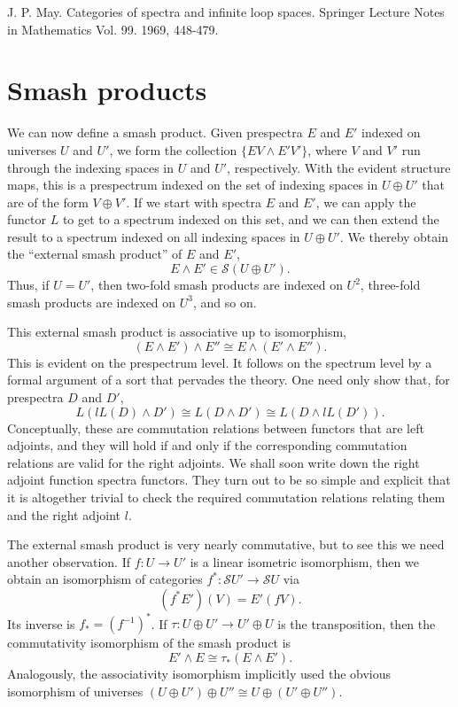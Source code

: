\begin{remark}
J. P. May. Categories of spectra and infinite loop spaces. Springer Lecture Notes in Mathematics Vol. 99. 1969, 448-479.
\end{remark}

\section{Smash products}

We can now define a smash product. Given prespectra $E$ and $E'$ indexed on universes $U$ and $U'$, we form the collection $\{EV \wedge E'V'\}$, where $V$ and $V'$ run through the indexing spaces in $U$ and $U'$, respectively. With the evident structure maps, this is a prespectrum indexed on the set of indexing spaces in $U \oplus U'$ that are of the form $V \oplus V'$. If we start with spectra $E$ and $E'$, we can apply the functor $L$ to get to a spectrum indexed on this set, and we can then extend the result to a spectrum indexed on all indexing spaces in $U \oplus U'$. We thereby obtain the ``external smash product'' of $E$ and $E'$,
\[ E \wedge E' \in \mathscr{S}(U \oplus U'). \]
Thus, if $U=U'$, then two-fold smash products are indexed on $U^2$, three-fold smash products are indexed on $U^3$, and so on.

This external smash product is associative up to isomorphism,
\[ (E \wedge E') \wedge E'' \cong E \wedge (E' \wedge E''). \]
This is evident on the prespectrum level. It follows on the spectrum level by a formal argument of a sort that pervades the theory. One need only show that, for prespectra $D$ and $D'$,
\[ L(lL(D) \wedge D') \cong L(D \wedge D') \cong L(D \wedge lL(D')). \]
Conceptually, these are commutation relations between functors that are left adjoints, and they will hold if and only if the corresponding commutation relations are valid for the right adjoints. We shall soon write down the right adjoint function spectra functors. They turn out to be so simple and explicit that it is altogether trivial to check the required commutation relations relating them and the right adjoint $l$.

The external smash product is very nearly commutative, but to see this we need another observation. If $f: U \longrightarrow U'$ is a linear isometric isomorphism, then we obtain an isomorphism of categories $f^*: \mathscr{S}U' \longrightarrow \mathscr{S}U$ via
\[ (f^*E')(V) = E'(fV). \]
Its inverse is $f_* = (f^{-1})^*$. If $\tau: U \oplus U' \longrightarrow U' \oplus U$ is the transposition, then the commutativity isomorphism of the smash product is
\[ E' \wedge E \cong \tau_*(E \wedge E'). \]
Analogously, the associativity isomorphism implicitly used the obvious isomorphism of universes $(U \oplus U') \oplus U'' \cong U \oplus (U' \oplus U'')$.

